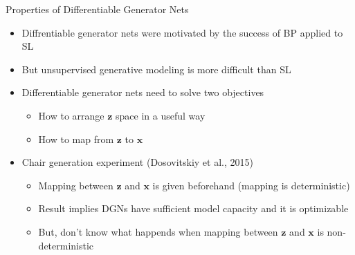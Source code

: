 \documentclass[dvipdfmx,presentation]{beamer}
\def\bf{\mathbf}
\begin{document}
\begin{frame}[label={sec:orgheadline19}]{Properties of Differentiable Generator Nets}
\begin{itemize}
\item Diffrentiable generator nets were motivated by the success of BP applied to SL
\item But unsupervised generative modeling is more difficult than SL
\item Differentiable generator nets need to solve two objectives
\begin{itemize}
\item How to arrange \(\bf{z}\) space in a useful way
\item How to map from \(\bf{z}\) to \(\bf{x}\)
\end{itemize}
\item Chair generation experiment (Dosovitskiy et al., 2015)
\begin{itemize}
\item Mapping between \(\bf{z}\) and \(\bf{x}\) is given beforehand (mapping is deterministic)
\item Result implies DGNs have sufficient model capacity and it is optimizable
\item But, don't know what happends when mapping between \(\bf{z}\) and \(\bf{x}\) is non-deterministic
\end{itemize}
\end{itemize}
\end{frame}
\end{document}

